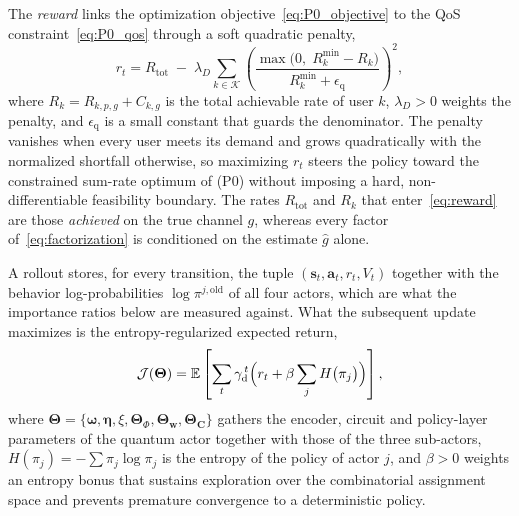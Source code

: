 \documentclass[12pt,onecolumn]{IEEEtran}
\begin{document}
The \emph{reward} links the optimization objective~\eqref{eq:P0_objective} to the QoS constraint~\eqref{eq:P0_qos} through a soft quadratic penalty,
\begin{equation}
    r_t
    =
    R_{\mathrm{tot}}
    \;-\;
    \lambda_D \sum_{k \in \mathcal{K}}
    \left(
      \frac{\max\bigl(0,\; R_k^{\min} - R_k\bigr)}{R_k^{\min} + \epsilon_{\mathrm q}}
    \right)^{\!2},
    \label{eq:reward}
\end{equation}
where $R_k = R_{k,p,g} + C_{k,g}$ is the total achievable rate of user $k$, $\lambda_D>0$ weights the penalty, and $\epsilon_{\mathrm q}$ is a small constant that guards the denominator.
The penalty vanishes when every user meets its demand and grows quadratically with the normalized shortfall otherwise, so maximizing $r_t$ steers the policy toward the constrained sum-rate optimum of (P0) without imposing a hard, non-differentiable feasibility boundary.
The rates $R_{\mathrm{tot}}$ and $R_k$ that enter~\eqref{eq:reward} are those \emph{achieved} on the true channel $g$, whereas every factor of~\eqref{eq:factorization} is conditioned on the estimate $\hat{g}$ alone.

A rollout stores, for every transition, the tuple $(\mathbf{s}_t,\mathbf{a}_t,r_t,V_t)$ together with the behavior log-probabilities $\log\pi^{j,\mathrm{old}}$ of all four actors, which are what the importance ratios below are measured against.
What the subsequent update maximizes is the entropy-regularized expected return,
\begin{equation}
    \mathcal{J}(\boldsymbol{\Theta})
    =
    \mathbb{E}\left[
      \sum_{t} \gamma_{\mathrm d}^{\,t}
      \Bigl( r_t + \beta \sum_{j} H\bigl(\pi_j\bigr) \Bigr)
    \right],
    \label{eq:objective}
\end{equation}
where $\boldsymbol{\Theta}=\{\boldsymbol{\omega},\boldsymbol{\eta},\xi,\boldsymbol{\Theta}_{\Phi},\boldsymbol{\Theta}_{\mathbf{w}},\boldsymbol{\Theta}_{\mathbf{C}}\}$ gathers the encoder, circuit and policy-layer parameters of the quantum actor together with those of the three sub-actors, $H(\pi_j) = -\sum \pi_j \log \pi_j$ is the entropy of the policy of actor $j$, and $\beta>0$ weights an entropy bonus that sustains exploration over the combinatorial assignment space and prevents premature convergence to a deterministic policy.
\end{document}
